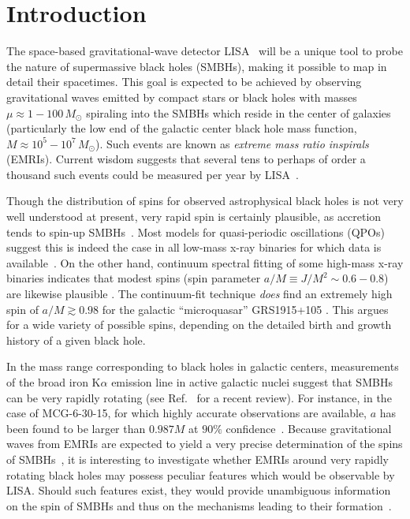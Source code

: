 \documentclass[aps,prd,twocolumn,showpacs,groupedaddress,nofootinbib]{revtex4}
\begin{document}
\maketitle

\section{\label{sec:intro}Introduction}


The space-based gravitational-wave detector LISA~\cite{LISA} will be a
unique tool to probe the nature of supermassive black holes (SMBHs),
making it possible to map in detail their spacetimes.  This goal is
expected to be achieved by observing gravitational waves emitted by
compact stars or black holes with masses $\mu \approx 1 -
100\,M_\odot$ spiraling into the SMBHs which reside in the center of
galaxies~\cite{SMBH} (particularly the low end of the galactic center
black hole mass function, $M \approx 10^5 - 10^7\,M_\odot$).  Such
events are known as {\it extreme mass ratio inspirals} (EMRIs).
Current wisdom suggests that several tens to perhaps of order a
thousand such events could be measured per year by
LISA~\cite{gair_event_rates}.

Though the distribution of spins for observed astrophysical black
holes is not very well understood at present, very rapid spin is
certainly plausible, as accretion tends to spin-up
SMBHs~\cite{shapiro}.  Most models for quasi-periodic oscillations (QPOs) suggest this is indeed the case
in all low-mass x-ray binaries for which data is
available~\cite{rezzolla03}.  On the other hand, continuum spectral
fitting of some high-mass x-ray binaries indicates that modest spins
(spin parameter $a/M \equiv J/M^2 \sim 0.6 - 0.8$) are likewise
plausible {\cite{shafee_etal}}.  The continuum-fit technique {\it
does} find an extremely high spin of $a/M \gtrsim 0.98$ for the galactic ``microquasar'' GRS1915+105  {\cite{mcclintock_etal}}.  This argues
for a wide variety of possible spins, depending on the detailed birth
and growth history of a given black hole.

In the mass range corresponding to black holes in galactic centers,
measurements of the broad iron K$\alpha$ emission line in active
galactic nuclei suggest that SMBHs can be very rapidly rotating (see
Ref.\ \cite{iron_line_rev} for a recent review).  For instance, in the
case of MCG-6-30-15, for which highly accurate observations are
available, $a$ has been found to be larger than $0.987M$ at $90\%$
confidence~\cite{iron_line_res}.  Because gravitational waves from
EMRIs are expected to yield a very precise determination of the spins
of SMBHs~\cite{spin_measurements}, it is interesting to investigate
whether EMRIs around very rapidly rotating black holes may possess
peculiar features which would be observable by LISA. Should such
features exist, they would provide unambiguous information on the spin
of SMBHs and thus on the mechanisms leading to their
formation~\cite{volonteri}.
\end{document}
